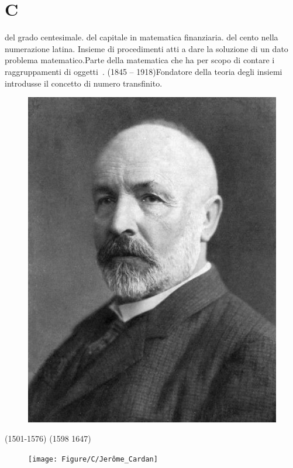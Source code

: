 \chapter{C} 
\vspace{5mm} 
  del grado centesimale. del capitale in matematica finanziaria. del cento nella numerazione latina.
 Insieme di procedimenti atti a dare la soluzione di un dato problema matematico.Parte della matematica che ha per scopo di contare i raggruppamenti di oggetti\pointsto~.
 (1845 – 1918)Fondatore della teoria degli insiemi introdusse il concetto di numero transfinito. 
\begin{figure}
	\centering
	\label{fig:georgcantor2}
	\includegraphics[width=0.7\linewidth]{Figure/C/Georg_Cantor2}
\end{figure}
(1501-1576)
(1598 1647)
\begin{figure}
	\centering
	\texttt{[image: Figure/C/Jerôme\_Cardan]}
	\label{fig:jeromecardan}
\end{figure}
